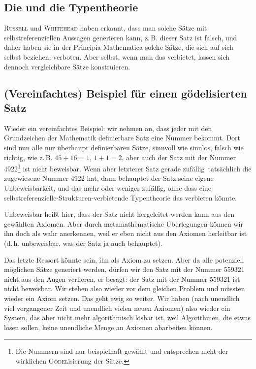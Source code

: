 \subsection*{Die  und die Typentheorie}

\textsc{Russell} und \textsc{Whitehead} haben erkannt, dass man solche Sätze mit selbstreferenziellen
Aussagen generieren kann, z.\,B. \frq dieser Satz ist falsch\flq, und daher haben sie
in der Principia Mathematica solche Sätze, die sich auf sich selbst beziehen,
\frq verboten\flq{}.
Aber selbst, wenn man das verbietet, lassen sich dennoch ver\-gleich\-bare Sätze
konstruieren.

\subsection*{(Vereinfachtes) Beispiel für einen gödelisierten Satz}

Wieder ein vereinfachtes Beispiel: wir nehmen an, dass jeder mit den Grundzeichen
der Mathematik definierbare Satz eine Nummer bekommt. Dort sind nun alle nur überhaupt
definierbaren Sätze, sinnvoll wie sinnlos, falsch wie richtig,
wie z.\,B. \frq $45 + 16 = 1$\flq, \frq $1 + 1 = 2$\flq, aber auch \frq der Satz mit
der Nummer 4922\footnote{Die Nummern sind nur beispielhaft gewählt und entsprechen
nicht der wirklichen \textsc{Gödel}isierung der Sätze.}
ist nicht beweisbar\flq. Wenn aber letzterer Satz gerade
\frq zufällig\flq\ tatsächlich die zugewiesene Nummer 4922 hat, dann behauptet
der Satz seine eigene Unbeweisbarkeit, und das mehr oder weniger
zufällig, ohne dass eine selbstreferenzielle-Strukturen-verbietende
Typentheorie das verbieten könnte.

Unbeweisbar heißt hier, dass der Satz nicht hergeleitet werden kann aus den gewählten
Axiomen. Aber durch metamathematische Überlegungen können wir ihn doch als wahr anerkennen,
weil er eben nicht aus den Axiomen herleitbar ist (d.\,h. unbeweisbar, was der
Satz ja auch behauptet).

Das letzte Ressort könnte sein, ihn als Axiom zu setzen. Aber da alle potenziell
möglichen Sätze generiert werden, dürfen wir den Satz mit der Nummer 559321 nicht
aus den Augen verlieren, er besagt: \frq der Satz mit der Nummer 559321 ist
nicht beweisbar\flq{}. Wir
stehen also wieder vor dem gleichen Problem und müssten
wieder ein Axiom setzen. Das geht ewig so weiter. Wir haben (nach unendlich viel
vergangener Zeit und unendlich vielen neuen Axiomen) also wieder ein System,
das aber nicht mehr algorithmisch lösbar ist, weil Algorithmen, die etwas
lösen sollen, keine unendliche Menge an Axiomen abarbeiten können.

